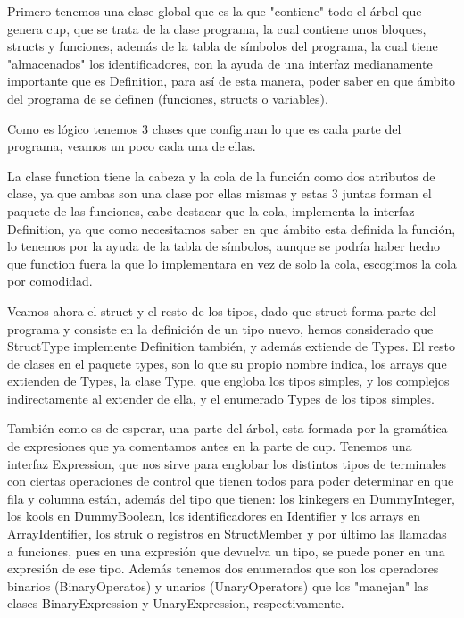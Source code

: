 \documentclass[a4paper, 11pt, twoside, openany, onecolumn, final]{memoir}
\begin{document}
	Primero tenemos una clase global que es la que "contiene" todo el árbol que genera cup, que se trata de la clase programa, la cual contiene unos bloques, structs y funciones, además de la tabla de símbolos del programa, la cual tiene "almacenados" los identificadores, con la ayuda de una interfaz medianamente importante que es Definition, para así de esta manera, poder saber en que ámbito del programa de se definen (funciones, structs o variables).
	
	Como es lógico tenemos 3 clases que configuran lo que es cada parte del programa, veamos un poco cada una de ellas.
	
	La clase function  tiene la cabeza y la cola de la función como dos atributos de clase, ya que ambas son una clase por ellas mismas y estas 3 juntas forman el paquete de las funciones, cabe destacar que la cola, implementa la interfaz Definition, ya que como necesitamos saber en que ámbito esta definida la función, lo tenemos por la ayuda de la tabla de símbolos, aunque se podría haber hecho que function fuera la que lo implementara en vez de solo la cola, escogimos la cola por comodidad.
	
	Veamos ahora el struct y el resto de los tipos, dado que struct forma parte del programa y consiste en la definición de un tipo nuevo, hemos considerado que StructType implemente Definition también, y además extiende de Types. El resto de clases en el paquete types, son lo que su propio nombre indica, los arrays que extienden de Types, la clase Type, que engloba los tipos simples, y los complejos indirectamente al extender de ella, y el enumerado Types de los tipos simples. 
	
	También como es de esperar, una parte del árbol, esta formada por la gramática de expresiones que ya comentamos antes en la parte de cup. 
	Tenemos una interfaz Expression, que nos sirve para englobar los distintos tipos de terminales con ciertas operaciones de control que tienen todos para poder determinar en que fila y columna están, además del tipo que tienen: los kinkegers en DummyInteger, los kools en DummyBoolean, los identificadores en Identifier y los arrays en ArrayIdentifier, los struk o registros en StructMember y por último las llamadas a funciones, pues en una expresión que devuelva un tipo, se puede poner en una expresión de ese tipo.
	Además tenemos dos enumerados que son los operadores binarios (BinaryOperatos) y unarios (UnaryOperators) que los "manejan" las clases BinaryExpression y UnaryExpression, respectivamente.  
	
\end{document}
